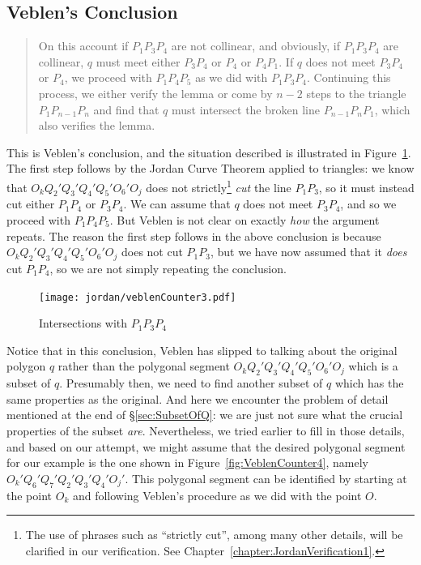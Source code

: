 \subsection{Veblen's Conclusion}
\begin{quote}On this account if $P_1P_3P_4$ are not collinear, and obviously, if $P_1P_3P_4$ are collinear, $q$ must meet either $P_3P_4$ or $P_4$ or $P_4P_1$. If $q$ does not meet $P_3P_4$ or $P_4$, we proceed with $P_1P_4P_5$ as we did with $P_1P_3P_4$. Continuing this process, we either verify the lemma or come by $n-2$ steps to the triangle $P_1P_{n-1}P_n$ and find that $q$ must intersect the broken line $P_{n-1}P_nP_1$, which also verifies the lemma.\end{quote}

This is Veblen's conclusion, and the situation described is illustrated in Figure~\ref{fig:VeblenCounter3}. The first step follows by the Jordan Curve Theorem applied to triangles: we know that $O_kQ_2'Q_3'Q_4'Q_5'O_6'O_j$ does not strictly\footnote{The use of phrases such as ``strictly cut'', among many other details, will be clarified in our verification. See Chapter~\ref{chapter:JordanVerification1}.} \emph{cut} the line $P_1P_3$, so it must instead cut either $P_1P_4$ or $P_3P_4$. We can assume that $q$ does not meet $P_3P_4$, and so we proceed with $P_1P_4P_5$. But Veblen is not clear on exactly \emph{how} the argument repeats. The reason the first step follows in the above conclusion is because $O_kQ_2'Q_3'Q_4'Q_5'O_6'O_j$ does not cut $P_1P_3$, but we have now assumed that it \emph{does} cut $P_1P_4$, so we are not simply repeating the conclusion. 

\begin{figure}
\centering
\texttt{[image: jordan/veblenCounter3.pdf]}
\caption{Intersections with $P_1P_3P_4$}
\label{fig:VeblenCounter3}
\end{figure}

Notice that in this conclusion, Veblen has slipped to talking about the original polygon $q$ rather than the polygonal segment $O_kQ_2'Q_3'Q_4'Q_5'O_6'O_j$ which is a subset of $q$. Presumably then, we need to find another subset of $q$ which has the same properties as the original. And here we encounter the problem of detail mentioned at the end of \S\ref{sec:SubsetOfQ}: we are just not sure what the crucial properties of the subset \emph{are}. Nevertheless, we tried earlier to fill in those details, and based on our attempt, we might assume that the desired polygonal segment for our example is the one shown in Figure~\ref{fig:VeblenCounter4}, namely $O_k'Q_6'Q_7'Q_2'Q_3'Q_4'O_j'$. This polygonal segment can be identified by starting at the point $O_k$ and following Veblen's procedure as we did with the point $O$. 

